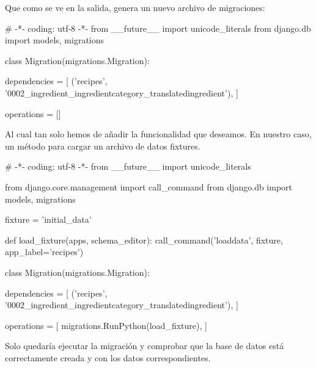Que como se ve en la salida, genera un nuevo archivo de migraciones:


\begin{pythoncode}
# -*- coding: utf-8 -*-
from __future__ import unicode_literals
from django.db import models, migrations
        
class Migration(migrations.Migration):
    
    dependencies = [
        ('recipes', '0002_ingredient_ingredientcategory_translatedingredient'),
    ]

    operations = []

\end{pythoncode}

Al cual tan solo hemos de añadir la funcionalidad que deseamos. En nuestro
caso, un método para cargar un archivo de datos fixtures.

    
\begin{pythoncode}
# -*- coding: utf-8 -*-
from __future__ import unicode_literals

from django.core.management import call_command
from django.db import models, migrations

fixture = 'initial_data'

def load_fixture(apps, schema_editor):
    call_command('loaddata', fixture, app_label='recipes')
        
class Migration(migrations.Migration):
    
    dependencies = [
        ('recipes', '0002_ingredient_ingredientcategory_translatedingredient'),
    ]

    operations = [
        migrations.RunPython(load_fixture),
    ]
\end{pythoncode}

Solo quedaría ejecutar la migración y comprobar que la base de datos está
correctamente creada y con los datos correspondientes.


